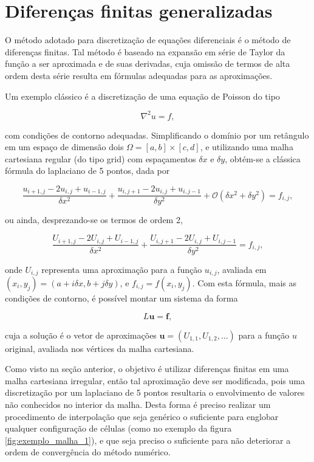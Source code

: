 \section{Diferenças finitas generalizadas}

O método adotado para discretização de equações diferenciais é o método de
dife\-ren\-ças finitas. Tal método é baseado na expansão em série de Taylor da
função a ser aproximada e de suas derivadas, cuja omissão de termos de alta
ordem desta série resulta em fórmulas adequadas para as aproximações.

Um exemplo clássico é a discretização de uma equação de Poisson do tipo

\[
\nabla^2 u = f,
\]

com condições de contorno adequadas. Simplificando o domínio por um retângulo
em um espaço de dimensão dois $\Omega=[a,b]\times [c,d]$, e utilizando uma
malha cartesiana regular (do tipo grid) com espaçamentos $\delta x$ e $\delta y
$, obtém-se a clássica fórmula do laplaciano de 5 pontos, dada por

\[
\frac{u_{i+1,j} - 2 u_{i,j} + u_{i-1,j}}{\delta x^2} + \frac{u_{i,j+1} - 2 u_{i,j} + u_{i,j-1}}{\delta y^2} + \mathcal{O}(\delta x^2 + \delta y^2)= f_{i,j},
\]

\noindent ou ainda, desprezando-se os termos de ordem 2,

\[
\frac{U_{i+1,j} - 2 U_{i,j} + U_{i-1,j}}{\delta x^2} + \frac{U_{i,j+1} - 2 U_{i,j} + U_{i,j-1}}{\delta y^2} = f_{i,j},
\]

\noindent onde $U_{i,j}$ representa uma aproximação para a função $u_{i,j}$, avaliada em
$(x_i,y_j) = (a+i\delta x, b + j\delta y)$, e $f_{i,j} = f(x_i,y_j)$. Com esta
fórmula, mais as condições de contorno, é possível montar um sistema da forma

\[
L\mathbf{u} = \mathbf{f},
\]

\noindent cuja a solução é o vetor de aproximações $\mathbf{u} = (U_{1,1},
U_{1,2}, \dots)$ para a função $u$ original, avaliada nos vértices da malha
cartesiana.

Como visto na seção anterior, o objetivo é utilizar diferenças finitas em uma
malha cartesiana irregular, então tal aproximação deve ser modificada, pois uma
discretização por um laplaciano de 5 pontos resultaria o envolvimento de
valores não conhecidos no interior da malha. Desta forma é preciso realizar um
procedimento de interpolação que seja genérico o suficiente para englobar
qualquer configuração de células (como no exemplo da figura
\ref{fig:exemplo_malha_1}), e que seja preciso o suficiente para não deteriorar
a ordem de convergência do método numérico.


